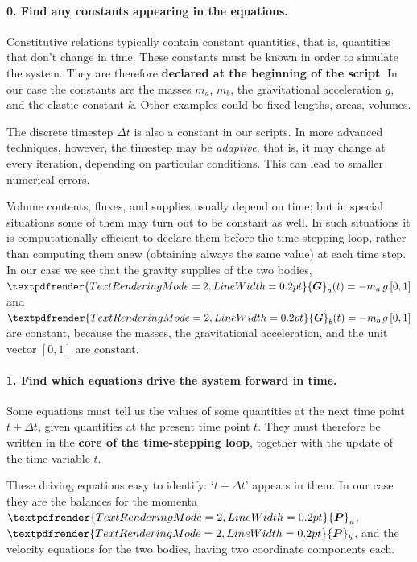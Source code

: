 \documentclass[a4paper,12pt,%
onecolumn,oneside,%
british%
]{memoir}
\renewcommand*{\bm}[1]{\textpdfrender{TextRenderingMode=2,LineWidth=0.2pt}{\boldsymbol{#1}}}
\newcommand*{\incr}{\Delta}%
\renewcommand*{\|}[1][]{\nonscript\:#1\vert\nonscript\:\mathopen{}}
\newcommand*{\Dt}{\incr t}
\newcommand*{\yM}{m}%
\newcommand*{\yMa}{\yM_{a}}
\newcommand*{\yMb}{\yM_{b}}
\newcommand*{\yP}{\bm{P}}
\newcommand*{\yPa}{\yP_{a}}
\newcommand*{\yPb}{\yP_{b}}
\newcommand*{\yG}{\bm{G}}
\newcommand*{\yGa}{\yG_{a}}
\newcommand*{\yGb}{\yG_{b}}
\begin{document}
\paragraph{\color{red}0. Find any constants appearing in the equations.}

Constitutive relations typically contain constant quantities, that is, quantities that don't change in time. These constants must be known in order to simulate the system. They are therefore \textbf{declared at the beginning of the script}. In our case the constants are the masses $\yMa$, $\yMb$, the gravitational acceleration $g$, and the elastic constant $k$. Other examples could be fixed lengths, areas, volumes.

The discrete timestep $\Dt$ is also a constant in our scripts. In more advanced techniques, however, the timestep may be \emph{adaptive}, that is, it may change at every iteration, depending on particular conditions. This can lead to smaller numerical errors.

Volume contents, fluxes, and supplies usually depend on time; but in special situations some of them may turn out to be constant as well. In such situations it is computationally efficient to declare them before the time-stepping loop, rather than computing them anew (obtaining always the same value) at each time step. In our case we see that the gravity supplies of the two bodies, $\yGa(t) = -\yMa\,g\,[0,1]$ and $\yGb(t) = -\yMb\,g\,[0,1]$ are constant, because the masses, the gravitational acceleration, and the unit vector $[0,1]$ are constant.


\paragraph{\color{green}1. Find which equations drive the system forward in time.}

Some equations must tell us the values of some quantities at the next time point $t+\Dt$, given quantities at the present time point $t$. They must therefore be written in the \textbf{core of the time-stepping loop}, together with the update of the time variable $t$.

These driving equations easy to identify: \enquote*{$t+\Dt$} appears in them. In our case they are the balances for the momenta $\yPa$, $\yPb$, and the velocity equations for the two bodies, having two coordinate components each.
\end{document}
